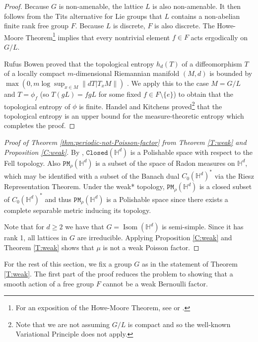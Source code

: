 \documentclass[11pt]{amsart}
\theoremstyle{definition}
\theoremstyle{remark}
\renewcommand{\H}{\mathbb{H}}
\newcommand{\cP}{\mathtt{PM}}
\newcommand{\Closed}{\mathtt{Closed}}
\newcommand{\Isom}{\operatorname{Isom}}
\begin{document}
\begin{proof}
    Because $G$ is non-amenable, the lattice $L$ is also non-amenable. It then follows from the Tits alternative for Lie groups \cite{MR286898} that $L$ contains a non-abelian finite rank free group $F$.     Because $L$ is discrete, $F$ is also discrete. The Howe-Moore Theorem\footnote{For an exposition of the Howe-Moore Theorem, see \cite[Theorem 2.2.20]{zimmer} or \cite[Theorem 1.1]{MR1781937}.} implies that every nontrivial element $f\in F$ acts ergodically on  $G/L$.   
    
Rufus Bowen proved that the topological entropy $h_d(T)$ of a diffeomorphism $T$ of a locally compact $m$-dimensional Riemannian manifold $(M,d)$ is bounded by $\max(0, m \log \sup_{x \in M} \|dT|T_xM\|)$ \cite[Proposition 12]{MR274707}. We apply this to the case $M=G/L$ and $T=\phi_f$ (so $T(gL)=fgL$ for some fixed $f \in F \setminus \{e\}$) to obtain that the topological entropy of $\phi$ is finite.  Handel and Kitchens proved\footnote{Note that we are not assuming $G/L$ is compact and so the well-known Variational Principle does not apply.}  that the topological entropy is an upper bound for the measure-theoretic entropy \cite[Proposition 1.4]{MR1348316} which completes the proof. 
\end{proof}






\begin{proof}[Proof of Theorem \ref{thm:periodic-not-Poisson-factor} from Theorem \ref{T:weak} and Proposition \ref{C:weak}]
    By \cite[Theorem 5.1.5]{beer1993topologies}, $\Closed(\H^d)$ is a Polishable  space with respect to the Fell topology.  Also $\cP_\rho(\H^d)$ is a subset of the space of Radon measures on $\H^d$, which may be identified with a subset of the Banach dual $C_0(\H^d)^*$ via the Riesz Representation Theorem.  Under the weak* topology, $\cP_\rho(\H^d)$ is a closed subset of $C_0(\H^d)^*$ and thus $\cP_\rho(\H^d)$ is a Polishable space since there exists a complete separable metric inducing its topology.  

  Note that for $d\geq 2$ we have that $G = \Isom(\H^d)$ is semi-simple. Since it has rank 1, all lattices in $G$ are irreducible.  
%
    Applying Proposition \ref{C:weak} and Theorem \ref{T:weak} shows that $\mu$ is not a weak Poisson factor.
\end{proof}


For the rest of this section, we fix a group $G$ as in the statement of Theorem \ref{T:weak}. The first part of the proof reduces the problem to showing that a smooth action of a free group $F$ cannot be a weak Bernoulli factor. 
\end{document}
